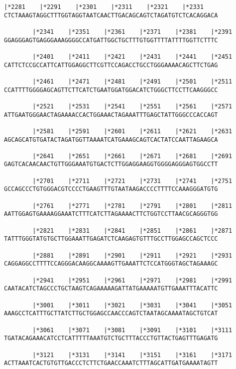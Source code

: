 \documentclass{article}
\begin{document}
\newpage
\begin{Verbatim}[fontfamily=courier]
        |*2281    |*2291    |*2301    |*2311    |*2321    |*2331
CTCTAAAGTAGGCTTTGGTAGGTAATCAACTTGACAGCAGTCTAGATGTCTCACAGGACA

        |*2341    |*2351    |*2361    |*2371    |*2381    |*2391
GGAGGGAGTGAGGGAAAGGGGCCATGATTGGCTGCTTTGTGGTTTTATTTTGGTTCTTTC

        |*2401    |*2411    |*2421    |*2431    |*2441    |*2451
CATTCTCCGCCATTCATTGGAGGCTTCGTTCCAGACCTGCCTGGGAAAACAGCTTCTGAG

        |*2461    |*2471    |*2481    |*2491    |*2501    |*2511
CCATTTTGGGGAGCAGTTCTTCATCTGAATGGATGGACATCTGGGCTTCCTTCAAGGGCC

        |*2521    |*2531    |*2541    |*2551    |*2561    |*2571
ATTGAATGGGAACTAGAAAACCACTGGAAACTAGAAATTTGAGCTATTGGGCCCACCAGT

        |*2581    |*2591    |*2601    |*2611    |*2621    |*2631
AGCAGCATGTGATACTAGATGGTTAAAATCATGAAAGCAGTCACTATCCAATTAGAAGCA

        |*2641    |*2651    |*2661    |*2671    |*2681    |*2691
GAGTCACAACAACTGTTGGGAAATGTGACTCTTGGAGGAAGGTGGGGAGGGAGTGGCCTT

        |*2701    |*2711    |*2721    |*2731    |*2741    |*2751
GCCAGCCCTGTGGGACGTCCCCTGAAGTTTGTAATAAGACCCCTTTTCCAAAGGGATGTG

        |*2761    |*2771    |*2781    |*2791    |*2801    |*2811
AATTGGAGTGAAAAGGAAATCTTTCATCTTAGAAAACTTCTGGTCCTTAACGCAGGGTGG

        |*2821    |*2831    |*2841    |*2851    |*2861    |*2871
TATTTGGGTATGTGCTTGGAAATTGAGATCTCAAGAGTGTTTGCCTTGGAGCCAGCTCCC

        |*2881    |*2891    |*2901    |*2911    |*2921    |*2931
CAGGAGGCCTTTTCCAGGGACAAGGCAAAAGTTGAAATTCTCCATGGGTAGCTAGAAAGC

        |*2941    |*2951    |*2961    |*2971    |*2981    |*2991
CAATACATCTAGCCCTGCTAAGTCAGAAAAAGATTATGAAAAATGTTGAAATTTACATTC

        |*3001    |*3011    |*3021    |*3031    |*3041    |*3051
AAAGCCTCATTTGCTTATCTTGCTGGAGCCAACCCAGTCTAATAGCAAAATAGCTGTCAT

        |*3061    |*3071    |*3081    |*3091    |*3101    |*3111
TGATACAGAAACATCCTCATTTTTAAATGTCTGCTTTACCCTGTTACTGAGTTTGAGATG

        |*3121    |*3131    |*3141    |*3151    |*3161    |*3171
ACTTAAATCACTGTGTTGACCCTCTTCTGAACCAAATCTTTAGCATTGATGAAAATAGTT

\end{Verbatim}
\end{document}
